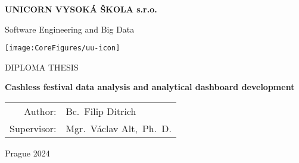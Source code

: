\pagestyle{empty}
\begin{center}

{\bfseries\large UNICORN VYSOKÁ ŠKOLA s.r.o.}

	\vspace{5mm}

	{\Large Software Engineering and Big Data}

	\vfill
	\vspace{5mm}

	\centerline{\mbox{\texttt{[image: \\CoreFigures/uu-icon]}}}

	\vfill
	\vspace{5mm}

	{\large\MakeUppercase{Diploma Thesis}}

	\vspace{15mm}

	{\LARGE\bfseries Cashless festival data analysis and analytical dashboard development}

	\vfill

	\begin{tabular}{rl}
		Author:     & Bc.~Filip Ditrich       \\
		\noalign{\vspace{2mm}}
		Supervisor: & Mgr.~Václav Alt,~Ph.~D. \\
	\end{tabular}

	\vfill

	Prague 2024

\end{center}
